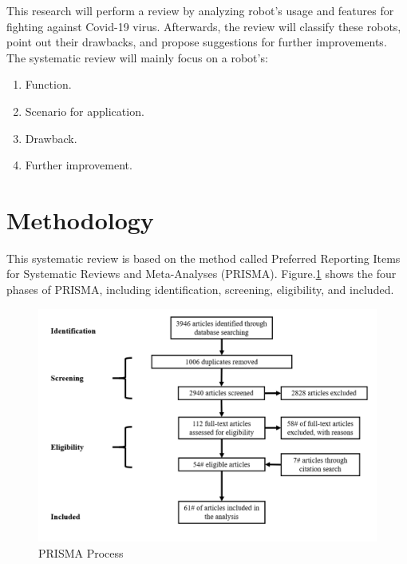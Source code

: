 \documentclass[a4paper]{article}
\begin{document}
\par 
    This research will perform a review by analyzing robot's usage and features for fighting against Covid-19 virus. Afterwards, the review will classify these robots, point out their drawbacks, and propose suggestions for further improvements. The systematic review will mainly focus on a robot's: 
\begin{enumerate}
    \item Function.
    \item Scenario for application.
    \item Drawback.
    \item Further improvement.
\end{enumerate}
\section{Methodology}
    This systematic review is based on the method called Preferred Reporting Items for Systematic Reviews and Meta-Analyses (PRISMA)\cite{99}.
Figure.\ref{PRISMA} shows the four phases of PRISMA, including identification, screening, eligibility, and included. 
\begin{figure}[H]
    \centering
    \includegraphics[scale=0.2]{PRISMA.png}
    \caption{PRISMA Process}
    \label{PRISMA}
\end{figure}
\end{document}
